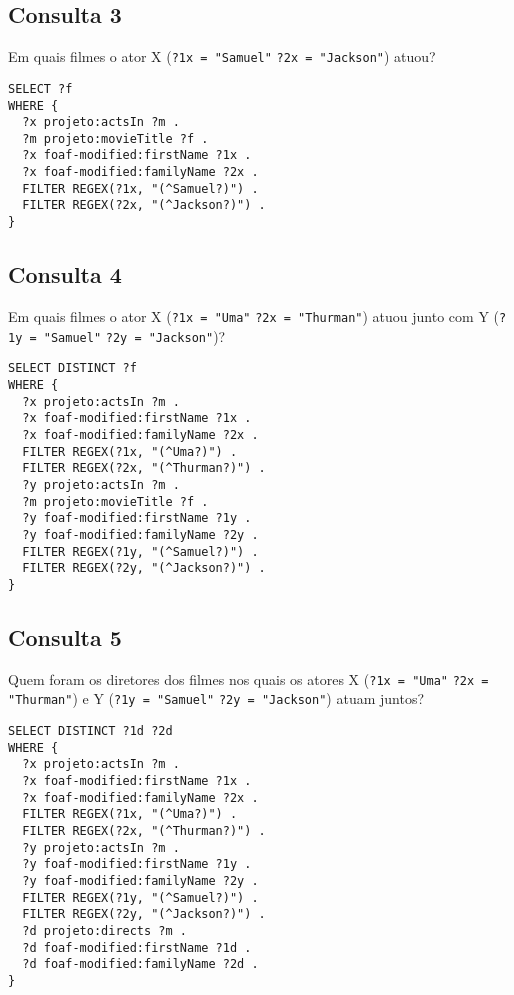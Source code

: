 \documentclass{article}
\newcommand{\code}[1]{\lstinline[mathescape=true]{#1}}
\begin{document}
\subsection{Consulta 3}
Em quais filmes o ator X (\code{?1x = "Samuel"} \code{?2x = "Jackson"}) atuou?
\begin{lstlisting}[basicstyle=\ttfamily,frame=single]
SELECT ?f
WHERE {
  ?x projeto:actsIn ?m .
  ?m projeto:movieTitle ?f .
  ?x foaf-modified:firstName ?1x .
  ?x foaf-modified:familyName ?2x .
  FILTER REGEX(?1x, "(^Samuel?)") .
  FILTER REGEX(?2x, "(^Jackson?)") .
}
\end{lstlisting}
\subsection{Consulta 4}
Em quais filmes o ator X (\code{?1x = "Uma"} \code{?2x = "Thurman"}) atuou junto com Y (\code{?1y = "Samuel"} \code{?2y = "Jackson"})?
\begin{lstlisting}[basicstyle=\ttfamily,frame=single]
SELECT DISTINCT ?f
WHERE {
  ?x projeto:actsIn ?m .
  ?x foaf-modified:firstName ?1x .
  ?x foaf-modified:familyName ?2x .
  FILTER REGEX(?1x, "(^Uma?)") .
  FILTER REGEX(?2x, "(^Thurman?)") .
  ?y projeto:actsIn ?m .
  ?m projeto:movieTitle ?f .
  ?y foaf-modified:firstName ?1y .
  ?y foaf-modified:familyName ?2y .
  FILTER REGEX(?1y, "(^Samuel?)") .
  FILTER REGEX(?2y, "(^Jackson?)") .
}
\end{lstlisting}
\subsection{Consulta 5}
Quem foram os diretores dos filmes nos quais os atores X (\code{?1x = "Uma"} \code{?2x = "Thurman"}) e Y (\code{?1y = "Samuel"} \code{?2y = "Jackson"}) atuam juntos?
\begin{lstlisting}[basicstyle=\ttfamily,frame=single]
SELECT DISTINCT ?1d ?2d
WHERE {
  ?x projeto:actsIn ?m .
  ?x foaf-modified:firstName ?1x .
  ?x foaf-modified:familyName ?2x .
  FILTER REGEX(?1x, "(^Uma?)") .
  FILTER REGEX(?2x, "(^Thurman?)") .
  ?y projeto:actsIn ?m .
  ?y foaf-modified:firstName ?1y .
  ?y foaf-modified:familyName ?2y .
  FILTER REGEX(?1y, "(^Samuel?)") .
  FILTER REGEX(?2y, "(^Jackson?)") .
  ?d projeto:directs ?m .
  ?d foaf-modified:firstName ?1d .
  ?d foaf-modified:familyName ?2d .
}
\end{lstlisting}
\end{document}
